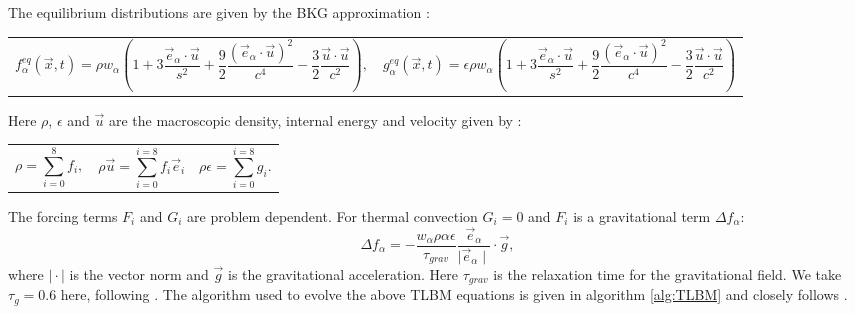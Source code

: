 \documentclass{article}
\begin{document}
\noindent The equilibrium distributions are given by the BKG approximation \cite{qian1992lattice}:
\newline
\begin{tabularx}{\textwidth}{XX}
\begin{equation}
	f^{eq}_{\alpha}(\vec{x}, t)  = \rho w_{\alpha} (1 + 3 \frac{\vec{e}_{\alpha} \cdot \vec{u}}{s^2} + \frac{9}{2} \frac{(\vec{e}_{\alpha} \cdot \vec{u}  )^2}{c^4} - \frac{3}{2} \frac{\vec{u} \cdot \vec{u}}{c^2}  ),
\end{equation}
    &
\begin{equation}
	g^{eq}_{\alpha}(\vec{x}, t)  = \epsilon \rho w_{\alpha} (1 + 3 \frac{\vec{e}_{\alpha} \cdot \vec{u}}{s^2} + \frac{9}{2} \frac{(\vec{e}_{\alpha} \cdot \vec{u}  )^2}{c^4} - \frac{3}{2} \frac{\vec{u} \cdot \vec{u}}{c^2}  )
\end{equation}
\end{tabularx}\par

\noindent Here $\rho$, $\epsilon$ and $\vec{u}$ are the macroscopic density, internal energy and velocity given by \cite{mora2017simulation}:

\begin{tabularx}{\textwidth}{XXX}
\begin{equation}
	\rho = \sum_{i=0}^{8} f_{i},
	\label{LBM rho}
\end{equation}
    &
\begin{equation}
	\rho \vec{u} = \sum_{i=0}^{i=8} f_{i} \vec{e}_{i}
	\label{LBM u}
\end{equation}
	&
\begin{equation}
	\rho \epsilon = \sum_{i=0}^{i=8} g_{i}.
	\label{LBM ep}
\end{equation}
\end{tabularx}\par

\noindent The forcing terms $F_i$ and $G_i$ are problem dependent. For thermal convection 
$G_i=0$ and $F_i$ is a gravitational term ${\Delta f}_{\alpha}$:
\begin{equation}
	{\Delta f}_{\alpha} = - 
	\frac{w_{\alpha} \rho \alpha \epsilon}{\tau_{grav}}
	 \frac{\vec{e}_{\alpha}}{\mid \vec{e}_{\alpha} \mid} \cdot \vec{g} ,
\end{equation}
\noindent where $\mid \cdot \mid$ is the vector norm and $\vec{g}$ is the gravitational 
acceleration. Here $\tau_{grav}$ is the relaxation time for the gravitational field. We 
take $\tau_g=0.6$ here, following \cite{mora2017simulation}. The algorithm used to evolve 
the above TLBM equations is given in algorithm \ref{alg:TLBM} and closely follows 
\cite{mora2017simulation}.
\end{document}
